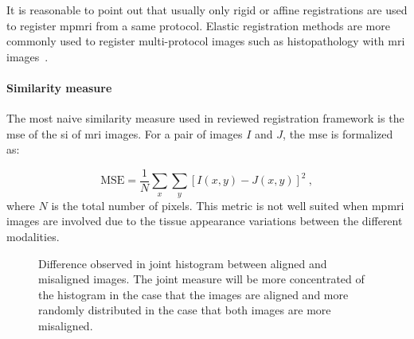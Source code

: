 It is reasonable to point out that usually only rigid or affine registrations are used to register \ac{mpmri} from a same protocol.
Elastic registration methods are more commonly used to register multi-protocol images such as histopathology with \ac{mri} images~\cite{Toth2008,Toth2009}.

\paragraph{Similarity measure}
The most naive similarity measure used in reviewed registration framework is the \acf{mse} of the \ac{si} of \ac{mri} images.
For a pair of images $I$ and $J$, the \ac{mse} is formalized as:

\begin{equation}
	\text{MSE} =\frac{1}{N} \sum_x \sum_y \left[ I(x,y) - J(x,y) \right]^2 \ ,
	\label{eq:mse}
\end{equation}
\noindent where $N$ is the total number of pixels.
This metric is not well suited when \ac{mpmri} images are involved due to the tissue appearance variations between the different modalities.

\begin{figure}
\centering
\hspace*{\fill}
 \hfill
{}
\hspace*{\fill}
	\caption[Difference observed in joint histogram between aligned and misaligned images.]{Difference observed in joint histogram between aligned and misaligned images. The joint measure will be more concentrated of the histogram in the case that the images are aligned and more randomly distributed in the case that both images are more misaligned.}
        \label{fig:jointhisto}
\end{figure}

